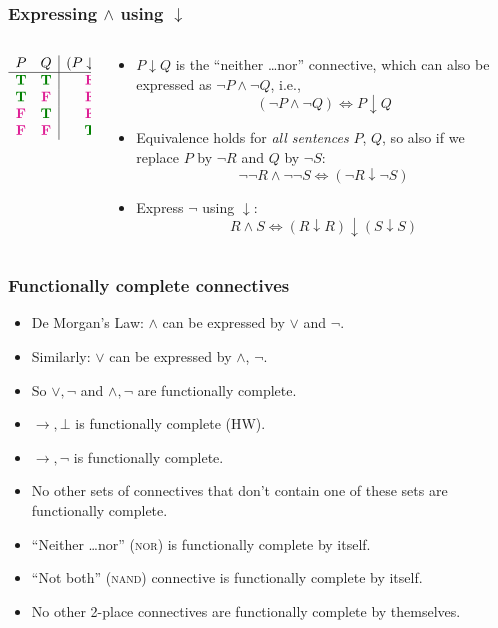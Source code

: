 \begin{frame}
    \frametitle{Expressing $\land$ using $\downarrow$}

\begin{columns}
\begin{column}{3cm}
\[\begin{array}{cc|c}
P & Q & (P \downarrow Q)\\
\hline
\True & \True & \False\\
\True & \False & \False\\
\False & \True & \False\\
\False & \False & \True
\end{array}\]
\end{column}
\begin{column}{7cm}
\begin{itemize}[<+->]
\item $P \downarrow Q$ is the ``neither \dots nor'' connective, which can also
be expressed as $\lnot P \land \lnot Q$, i.e.,
\[ (\lnot P \land \lnot Q) \Leftrightarrow P \downarrow Q \]
\item Equivalence holds for \emph{all sentences} $P$, $Q$, so also if we replace $P$ by $\lnot R$ and $Q$ by $\lnot S$:
\[
\lnot\lnot R \land \lnot\lnot S \Leftrightarrow (\lnot R \downarrow \lnot S)
\]
\item Express $\lnot$ using $\downarrow$:
\[
R \land S \Leftrightarrow (R \downarrow R)\downarrow(S \downarrow S)
\]
\end{itemize}
\end{column}
\end{columns}

\end{frame}

\begin{frame}
    \frametitle{Functionally complete connectives}

\begin{itemize}[<+->]
\item De Morgan's Law: $\land$ can be expressed by $\lor$ and $\lnot$.
\item Similarly: $\lor$ can be expressed by $\land$, $\lnot$.
\item So $\lor, \lnot$ and $\land, \lnot$ are
  functionally complete.
\item $\to, \bot$ is functionally complete (HW).
\item $\to, \lnot$ is functionally complete.
\item No other sets of connectives that don't contain one of these
sets are functionally complete.
\item ``Neither \dots nor'' (\textsc{nor}) is functionally complete by itself.
\item ``Not both'' (\textsc{nand}) connective is functionally complete by itself.
\item No other 2-place connectives are functionally complete by themselves.
  \end{itemize}
\end{frame}

